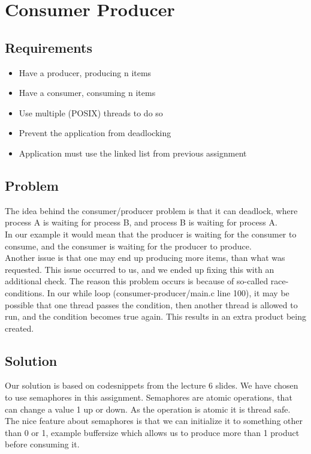 \chapter{Consumer Producer}

\section{Requirements}

\begin{itemize}
\item Have a producer, producing n items
\item Have a consumer, consuming n items
\item Use multiple (POSIX) threads to do so
\item Prevent the application from deadlocking
\item Application must use the linked list from previous assignment
\end{itemize}

\section{Problem}

The idea behind the consumer/producer problem is that it can deadlock, where process A is waiting for process B, and process B is waiting for process A.\\



In our example it would mean that the producer is waiting for the consumer to consume, and the consumer is waiting for the producer to produce.\\

Another issue is that one may end up producing more items, than what was requested. This issue occurred to us, and we ended up fixing this with an additional check.
The reason this problem occurs is because of so-called race-conditions.
In our while loop (consumer-producer/main.c line 100), it may be possible that one thread passes the condition, then another thread is allowed to run, and the condition becomes true again. This results in an extra product being created.

\section{Solution}
Our solution is based on codesnippets from the lecture 6 slides.
We have chosen to use semaphores in this assignment. Semaphores are atomic operations, that can change a value 1 up or down. As the operation is atomic it is thread safe. The nice feature about semaphores is that we can initialize it to something other than 0 or 1, example buffersize which allows us to produce more than 1 product before consuming it.
\\



